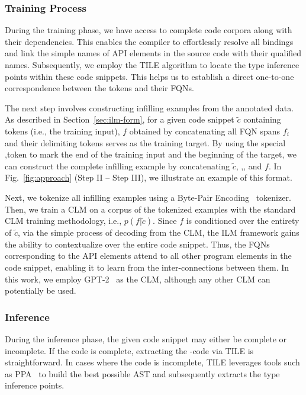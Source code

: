 \subsubsection{Training Process}
\label{sec:ilm-train}
During the training phase, we have access to complete code corpora along with their dependencies. This enables the compiler to effortlessly resolve all bindings and link the simple names of API elements in the source code with their qualified names. Subsequently, we employ the TILE algorithm to locate the type inference points within these code snippets. This helps us to establish a direct one-to-one correspondence between the \blank tokens and their FQNs.

The next step involves constructing infilling examples from the annotated data. As described in Section~\ref{sec:ilm-form}, 
for a given code snippet $\tilde{c}$ containing \blank tokens (i.e., the training input), $f$ obtained by concatenating all FQN spans $f_i$ and their delimiting \answer tokens serves as the training target. By using the special \sep token to mark the end of the training input and the beginning of the target, we can construct the complete infilling example by concatenating $\tilde{c}$, \sep, and $f$. In Fig.~\ref{fig:approach} (Step II -- Step III), we illustrate an example of this format.

Next, we tokenize all infilling examples using a Byte-Pair Encoding~\cite{radford2019language} tokenizer. Then, we train a CLM on a corpus of the tokenized examples with the standard CLM training methodology, i.e., $p(f|\tilde{c})$. Since $f$ is conditioned over the entirety of $\tilde{c}$, via the simple process of decoding from the CLM, the ILM framework gains the ability to contextualize over the entire code snippet. Thus, the FQNs corresponding to the API elements attend to all other program elements in the code snippet, enabling it to learn from the inter-connections between them. In this work, we employ GPT-2~\cite{radford2019language} as the CLM, although any other CLM can potentially be used.


\subsubsection{Inference}
\label{sec:ilm-infer}
During the inference phase, the given code snippet may either be complete or incomplete.
If the code is complete, extracting the \blank-code via TILE is straightforward. In cases where the code is incomplete, TILE leverages tools such as PPA~\cite{dagenais-oopsla08} to build the best possible AST and subsequently extracts the type inference points.

